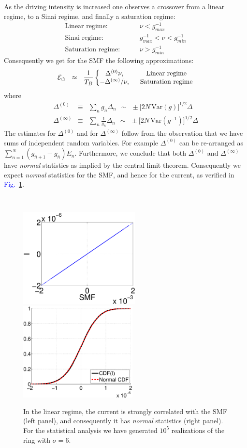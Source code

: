 \documentclass[aps,prl,floats,floatfix,twocolumn]{revtex4}
\newcommand{\amatrix}[1]{\begin{matrix} #1 \end{matrix}}
\newcommand{\mylabel}[1]{\label{#1}}
\newcommand{\beq}{\begin{eqnarray}}
\newcommand{\eeq}{\end{eqnarray}}
\newcommand{\be}[1]{\begin{eqnarray}\ifthenelse{#1=-1}
{\nonumber}{\ifthenelse{#1=0}{}{\mylabel{e#1}}}}
\newcommand{\Fig}[1]{\textcolor{blue}{Fig.}\!\!~\ref{#1}}
\begin{document}
As the driving intensity is increased one observes a crossover from 
a linear regime, to a Sinai regime, and finally a saturation regime: 
% 
\beq
\text{Linear regime:}     & \ \ \ \ \ & \ \nu < g_{max}^{-1} \\
\text{Sinai regime:}      &&  \ g_{max}^{-1} < \nu < g_{min}^{-1}\\
\text{Saturation regime:} && \ \nu > g_{min}^{-1}
\eeq
%
Consequently we get for the SMF the following approximations: 
%
\be{131}
\mathcal{E}_{\circlearrowleft} \ \ \approx \ \ 
\frac{1}{T_B}
\left\{
\amatrix{
\Delta^{(0)}\nu, & \ \ \text{Linear regime} \cr 
-\Delta^{(\infty)}/\nu , & \ \ \text{Saturation regime}
}\right.
\eeq
%
where 
%
\beq
\Delta^{(0)} &\equiv&  \sum_{n} g_{\bar{n}}  \Delta_n 
\ \ \sim  \ \ \pm \Big[2N \, \mbox{Var}(g)\Big]^{1/2} \Delta
\\
\Delta^{(\infty)} &\equiv& \sum_{n} \frac{1}{g_{\bar{n}}}  \Delta_n
\ \ \sim \ \ \pm \Big[2N \, \mbox{Var}(g^{-1})\Big]^{1/2} \Delta
\eeq
%
The estimates for $\Delta^{(0)}$ and for $\Delta^{(\infty)}$
follow from the observation that we have sums of independent 
random variables. For example $\Delta^{(0)}$ can be re-arranged 
as ${\sum_{n=1}^{N} (g_{\bar{n}+1}-g_{\bar{n}}) E_n}$.
Furthermore, we conclude that both $\Delta^{(0)} $ and $\Delta^{(\infty)}$
have {\em normal} statistics as implied by the 
central limit theorem. Consequently we expect {\em normal} statistics 
for the SMF, and hence for the current, as verified in \Fig{fa1}.

\ \\


\begin{figure}[h!]
\includegraphics[height=5cm]{lin2.eps}
\hspace*{2cm}
\includegraphics[height=5cm]{lin1.eps}

\caption{
In the linear regime, the current is strongly 
correlated with the SMF (left panel), and 
consequently it has {\em normal} statistics (right panel). 
For the statistical analysis we have generated $10^5$ 
realizations of the ring with $\sigma=6$. 
}
\label{fa1}
\end{figure}
\end{document}
